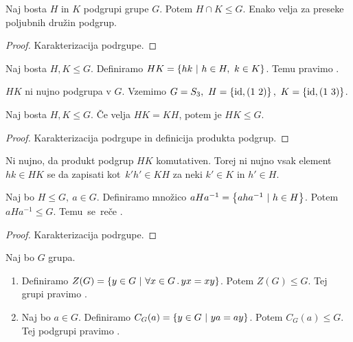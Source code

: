 \newpage
\begin{trditev}
    Naj bosta $H$ in $K$ podgrupi grupe $G$. Potem $H \cap K \leq G$. Enako velja za preseke poljubnih družin podgrup.
\end{trditev}

\begin{proof}
    Karakterizacija podrgupe.
\end{proof}

\begin{definicija}
    Naj bosta $H, K \leq G$. Definiramo $HK = \left\{hk \ | \ h \in H, \ k \in K\right\}$. Temu pravimo .
\end{definicija}

\begin{zgled}
    $H K$ ni nujno podgrupa v $G$. Vzemimo $G = S_3, \ H =\left\{\operatorname{id}, (1\ 2)\right\}, \ K = \left\{\operatorname{id}, (1\ 3)\right\}$.
\end{zgled}

\begin{trditev}
    Naj bosta $H, K \leq G$. Če velja $HK = KH$, potem je $HK \leq G$.
\end{trditev}

\begin{proof}
    Karakterizacija podrgupe in definicija produkta podgrup.
\end{proof}

\begin{opomba}
    Ni nujno, da produkt podgrup $HK$ komutativen. Torej ni nujno vsak element $hk \in HK$ se da zapisati kot~$k'h' \in KH$ za neki $k' \in K$ in $h' \in H$.
\end{opomba}

\begin{definicija}
    Naj bo $H \leq G, \ a \in G$. Definiramo množico $aHa^{-1} = \left\{aha^{-1} \ | \ h \in H\right\}$. Potem $aHa^{-1} \leq G$. Temu~se~reče .
\end{definicija}

\begin{proof}
    Karakterizacija podrgupe.
\end{proof}

\begin{trditev}
    Naj bo $G$ grupa.
    \begin{enumerate}
        \item Definiramo $Z(G) = \left\{y \in G \ | \ \forall x \in G \,.\, yx=xy\right\}$. Potem $Z(G) \leq G$. Tej grupi pravimo .
        \item Naj bo $a \in G$. Definiramo $C_G(a) = \left\{y \in G \ | \ ya = ay\right\}$. Potem $C_G(a) \leq G$. Tej podgrupi pravimo .
    \end{enumerate}
\end{trditev}

